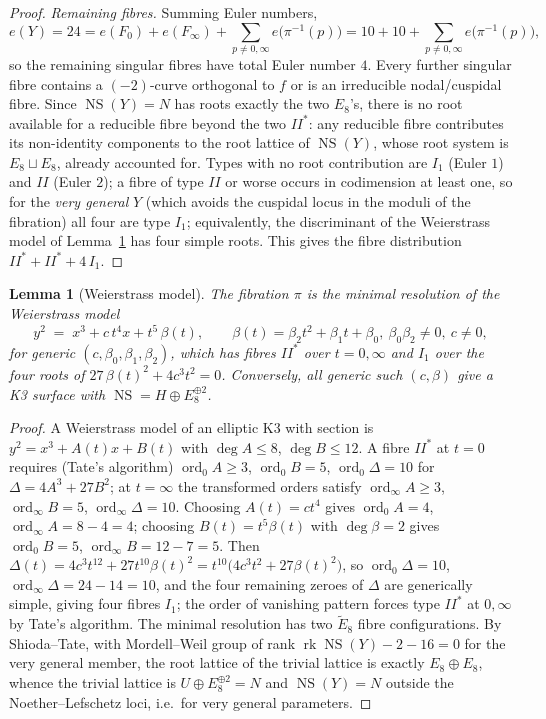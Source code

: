 \documentclass[11pt]{article}
\newtheorem{lemma}[theorem]{Lemma}
\DeclareMathOperator{\rk}{rk}
\DeclareMathOperator{\NS}{NS}
\begin{document}
\begin{proof}
\emph{Remaining fibres.} Summing Euler numbers,
\[
e(Y)=24= e(F_0)+e(F_\infty)+\sum_{p\ne 0,\infty} e\bigl(\pi^{-1}(p)\bigr)
=10+10+\sum_{p\ne0,\infty}e\bigl(\pi^{-1}(p)\bigr),
\]
so the remaining singular fibres have total Euler number $4$. Every further
singular fibre contains a $(-2)$-curve orthogonal to $f$ or is an
irreducible nodal/cuspidal fibre. Since $\NS(Y)=N$ has roots exactly the
two $E_8$'s, there is no root available for a reducible fibre beyond the two
$II^*$: any reducible fibre contributes its non-identity components to the
root lattice of $\NS(Y)$, whose root system is $E_8\sqcup E_8$, already
accounted for. Types with no root contribution are $I_1$ (Euler $1$) and
$II$ (Euler $2$); a fibre of type $II$ or worse occurs in codimension at
least one, so for the \emph{very general} $Y$ (which avoids the cuspidal
locus in the moduli of the fibration) all four are type $I_1$; equivalently,
the discriminant of the Weierstrass model of Lemma~\ref{lem:weierstrass}
has four simple roots. This gives the fibre distribution
$II^*+II^*+4\,I_1$.
\end{proof}

\begin{lemma}[Weierstrass model]\label{lem:weierstrass}
The fibration $\pi$ is the minimal resolution of the Weierstrass model
\[
y^2 \;=\; x^3 + c\, t^4 x + t^5\,\beta(t),\qquad
\beta(t)=\beta_2 t^2+\beta_1 t+\beta_0,\ \beta_0\beta_2\neq 0,\ c\neq 0,
\]
for generic $(c,\beta_0,\beta_1,\beta_2)$, which has fibres $II^*$ over
$t=0,\infty$ and $I_1$ over the four roots of $27\,\beta(t)^2 + 4 c^3 t^2 =
0$. Conversely, all generic such $(c,\beta)$ give a K3 surface with
$\NS = H\oplus E_8^{\oplus 2}$.
\end{lemma}

\begin{proof}
A Weierstrass model of an elliptic K3 with section is
$y^2 = x^3 + A(t)x + B(t)$ with $\deg A\le 8$, $\deg B\le 12$. A fibre
$II^*$ at $t=0$ requires (Tate's algorithm)
$\operatorname{ord}_0 A\ge 3$, $\operatorname{ord}_0 B = 5$,
$\operatorname{ord}_0 \Delta =10$ for $\Delta=4A^3+27B^2$; at $t=\infty$
the transformed orders satisfy $\operatorname{ord}_\infty A\ge 3$,
$\operatorname{ord}_\infty B=5$, $\operatorname{ord}_\infty\Delta=10$.
Choosing $A(t)=ct^4$ gives $\operatorname{ord}_0 A=4$,
$\operatorname{ord}_\infty A = 8-4=4$; choosing $B(t)=t^5\beta(t)$ with
$\deg\beta=2$ gives $\operatorname{ord}_0 B=5$,
$\operatorname{ord}_\infty B=12-7=5$. Then
$\Delta(t)=4c^3 t^{12}+27 t^{10}\beta(t)^2
=t^{10}\bigl(4c^3 t^2+27\beta(t)^2\bigr)$,
so $\operatorname{ord}_0\Delta=10$, $\operatorname{ord}_\infty\Delta=
24-14=10$, and the four remaining zeroes of $\Delta$ are generically simple,
giving four fibres $I_1$; the order of vanishing pattern forces type $II^*$
at $0,\infty$ by Tate's algorithm. The minimal resolution has two $\tilde
E_8$ fibre configurations. By Shioda--Tate, with Mordell--Weil group of
rank $\rk\NS(Y)-2-16=0$ for the very general member, the root lattice of
the trivial lattice is exactly $E_8\oplus E_8$, whence the trivial lattice
is $U\oplus E_8^{\oplus 2}=N$ and $\NS(Y)=N$ outside the
Noether--Lefschetz loci, i.e.\ for very general parameters.
\end{proof}
\end{document}

